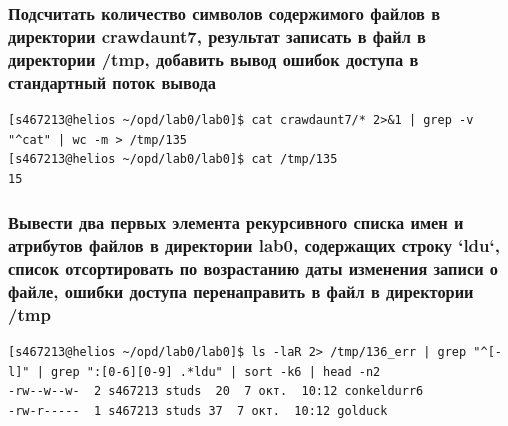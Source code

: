 \subsubsection*{Подсчитать количество символов содержимого файлов в директории crawdaunt7, результат записать в файл в директории /tmp, добавить вывод ошибок доступа в стандартный поток вывода}
\begin{verbatim}
[s467213@helios ~/opd/lab0/lab0]$ cat crawdaunt7/* 2>&1 | grep -v "^cat" | wc -m > /tmp/135
[s467213@helios ~/opd/lab0/lab0]$ cat /tmp/135
15
\end{verbatim}

\subsubsection*{Вывести два первых элемента рекурсивного списка имен и атрибутов файлов в директории lab0, содержащих строку `ldu`, список отсортировать по возрастанию даты изменения записи о файле, ошибки доступа перенаправить в файл в директории /tmp}
\begin{verbatim}
[s467213@helios ~/opd/lab0/lab0]$ ls -laR 2> /tmp/136_err | grep "^[-l]" | grep ":[0-6][0-9] .*ldu" | sort -k6 | head -n2
-rw--w--w-  2 s467213 studs  20  7 окт.  10:12 conkeldurr6
-rw-r-----  1 s467213 studs 37  7 окт.  10:12 golduck
\end{verbatim}